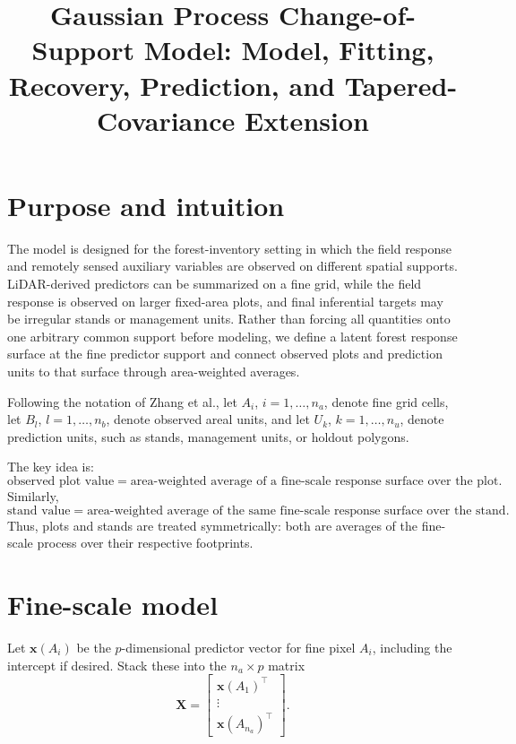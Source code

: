 \documentclass[11pt]{article}
\title{Gaussian Process Change-of-Support Model: Model, Fitting, Recovery, Prediction, and Tapered-Covariance Extension}
\author{}
\date{}
\newcommand{\bsx}{\bm{x}}
\begin{document}
\maketitle

\section{Purpose and intuition}

The model is designed for the forest-inventory setting in which the field response and remotely sensed auxiliary variables are observed on different spatial supports. LiDAR-derived predictors can be summarized on a fine grid, while the field response is observed on larger fixed-area plots, and final inferential targets may be irregular stands or management units. Rather than forcing all quantities onto one arbitrary common support before modeling, we define a latent forest response surface at the fine predictor support and connect observed plots and prediction units to that surface through area-weighted averages.

Following the notation of Zhang et al., let $A_i$, $i=1,\ldots,n_a$, denote fine grid cells, let $B_l$, $l=1,\ldots,n_b$, denote observed areal units, and let $U_k$, $k=1,\ldots,n_u$, denote prediction units, such as stands, management units, or holdout polygons.

The key idea is:
$$
\text{observed plot value} = \text{area-weighted average of a fine-scale response surface over the plot}.
$$
Similarly,
$$
\text{stand value} = \text{area-weighted average of the same fine-scale response surface over the stand}.
$$
Thus, plots and stands are treated symmetrically: both are averages of the fine-scale process over their respective footprints.

\section{Fine-scale model}

Let $\bsx(A_i)$ be the $p$-dimensional predictor vector for fine pixel $A_i$, including the intercept if desired. Stack these into the $n_a \times p$ matrix
\begin{equation}
\bm{X}
=
\begin{bmatrix}
\bsx(A_1)^\top\\
\vdots\\
\bsx(A_{n_a})^\top
\end{bmatrix}.
\label{eq:X}
\end{equation}
\end{document}
